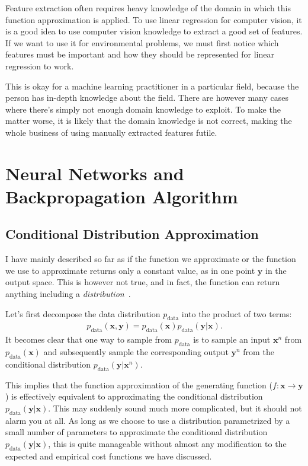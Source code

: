 \documentclass{report}
\newcommand{\vect}[1]{\mathbf{#1}}
\newcommand{\vx}[0]{\vect{x}}
\newcommand{\vy}[0]{\vect{y}}
\newcommand{\data}{\text{data}}
\begin{document}
Feature extraction often requires heavy knowledge of the domain in which this
function approximation is applied. To use linear regression for computer vision,
it is a good idea to use computer vision knowledge to extract a good set of
features. If we want to use it for environmental problems, we must first notice
which features must be important and how they should be represented for linear
regression to work. 

This is okay for a machine learning practitioner in a particular field, because
the person has in-depth knowledge about the field. There are however many cases
where there's simply not enough domain knowledge to exploit. To make the matter
worse, it is likely that the domain knowledge is not correct, making the whole
business of using manually extracted features futile.

\chapter{Neural Networks and Backpropagation Algorithm}
\label{chap:nn}

\section{Conditional Distribution Approximation}
\label{sec:distribution_approx}

I have mainly described so far as if the function we approximate or the function
we use to approximate returns only a constant value, as in one point $\vy$ in
the output space. This is however not true, and in fact, the function can return
anything including a {\em
distribution}~\cite{Bridle1990,denker1991transforming,bishop1994mixture}.

Let's first decompose the data distribution $p_{\data}$ into the product
of two terms:
\begin{align*}
    p_{\data}(\vx, \vy) = p_{\data}(\vx) p_{\data}(\vy |\vx).
\end{align*}
It becomes clear that one way to sample from $p_{\data}$ is to sample an input
$\vx^n$ from $p_{\data}(\vx)$ and subsequently sample the corresponding output
$\vy^n$ from the conditional distribution $p_{\data}(\vy | \vx^n)$. 

This implies that the function approximation of the generating function ($f:
\vx \to \vy$) is effectively equivalent to approximating the conditional
distribution $p_{\data}(\vy | \vx)$. This may suddenly sound much more
complicated, but it should not alarm you at all.  As long as we choose to use a
distribution parametrized by a small number of parameters to approximate the
conditional distribution $p_{\data}(\vy | \vx)$, this is quite manageable
without almost any modification to the expected and empirical cost functions we
have discussed. 
\end{document}
